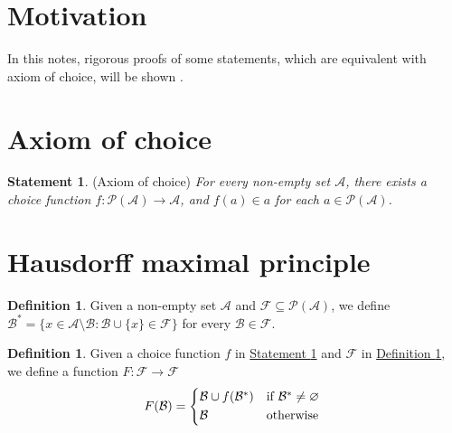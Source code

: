 \documentclass[12pt]{amsart}
\numberwithin{equation}{section}
\theoremstyle{plain} %
\theoremstyle{definition}
\newtheorem{definition}[equation]{Definition}
\newtheorem{statement}[equation]{Statement}
\theoremstyle{remark}
\begin{document}

\section{Motivation}
In this notes, rigorous proofs of some statements, which are equivalent with axiom of choice, will be shown .  

\section{Axiom of choice}

\begin{statement}
(Axiom of choice) \textit{For every non-empty set $\mathcal{A}$, there exists a choice function $f: \mathcal{P} (\mathcal{A}) \to \mathcal{A}$, and $f(a) \in a$ for each $a \in \mathcal{P} (\mathcal{A})$. } \label{statement:Axiom of choice}
\end{statement}

\section{Hausdorff maximal principle}

\begin{definition}
Given a  non-empty set $\mathcal{A}$ and $\mathcal{F} \subseteq \mathcal{P}(\mathcal{A})$, we define $\mathcal{B}^*=\{x \in \mathcal{A} \setminus \mathcal{B}: \mathcal{B} \cup \{x\} \in  \mathcal{F} \}$ for every $\mathcal{B} \in \mathcal{F}$. \label{definition:F}
\end{definition}

\begin{definition}
Given a choice function $f$ in \hyperref[statement:Axiom of choice]{Statement \ref*{statement:Axiom of choice}} and $\mathcal{F}$ in \hyperref[definition:F]{Definition \ref*{definition:F}}, we define a function $F: \mathcal{F} \to \mathcal{F}$ \label{definition:B_star}
	\begin{equation*}
	    F(\mathcal{B}) =
	    \begin{cases*}
		      \mathcal{B} \cup {f(\mathcal{B}^*)} & if $\mathcal{B}^* \neq  \varnothing$ \\
		     \mathcal{B}       & otherwise
	    \end{cases*}
	 \end{equation*}
\end{definition}
\end{document}
